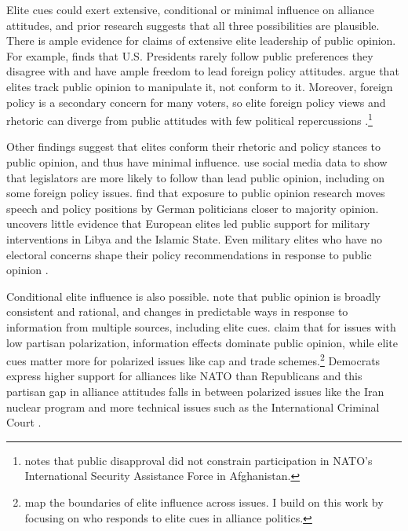 \documentclass[12pt]{article}
\begin{document}
Elite cues could exert extensive, conditional or minimal influence on alliance attitudes, and prior research suggests that all three possibilities are plausible. 
There is ample evidence for claims of extensive elite leadership of public opinion. 
For example, \citet{Canes-Wrone2006} finds that U.S. Presidents rarely follow public preferences they disagree with and have ample freedom to lead foreign policy attitudes. 
\citet{JacobsShapiro2000} argue that elites track public opinion to manipulate it, not conform to it.
Moreover, foreign policy is a secondary concern for many voters, so elite foreign policy views and rhetoric can diverge from public attitudes with few political repercussions \citep{BusbyMonten2012}.\footnote{\citet{Kreps2010} notes that public disapproval did not constrain participation in NATO's International Security Assistance Force in Afghanistan.}


Other findings suggest that elites conform their rhetoric and policy stances to public opinion, and thus have minimal influence. 
\citet{Barberaetal2019} use social media data to show that legislators are more likely to follow than lead public opinion, including on some foreign policy issues. 
\citet{HagerHilbig2020} find that exposure to public opinion research moves speech and policy positions by German politicians closer to majority opinion. 
\citet{Haesebrouck2019} uncovers little evidence that European elites led public support for military interventions in Libya and the Islamic State. 
Even military elites who have no electoral concerns shape their policy recommendations in response to public opinion \citep{LinGreenberg2021}. 


Conditional elite influence is also possible. 
\citet{PageShapiro1992} note that public opinion is broadly consistent and rational, and changes in predictable ways in response to information from multiple sources, including elite cues. 
\citet{GuisingerSaunders2017} claim that for issues with low partisan polarization, information effects dominate public opinion, while elite cues matter more for polarized issues like cap and trade schemes.\footnote{\citet{GuisingerSaunders2017} map the boundaries of elite influence across issues. I build on this work by focusing on who responds to elite cues in alliance politics.}
Democrats express higher support for alliances like NATO than Republicans \citep{PewNATO2020} and this partisan gap in alliance attitudes falls in between polarized issues like the Iran nuclear program and more technical issues such as the International Criminal Court \citet{GuisingerSaunders2017}. 
\end{document}
